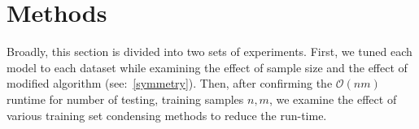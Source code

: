 \documentclass[conference]{IEEEtran}
\begin{document}








\section{Methods}
Broadly, this section is divided into two sets of experiments. First, we tuned each model to each dataset while examining the effect of sample size and the effect of modified algorithm (see:~\ref{symmetry}). Then, after confirming the $\mathcal{O}(nm)$ runtime for number of testing, training samples $n,m$, we examine the effect of various training set condensing methods to reduce the run-time. 


\label{methods}
\end{document}
